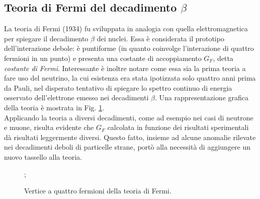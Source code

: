 \documentclass{subnucbo}
\begin{document}
\subsection{Teoria di Fermi del decadimento $\beta$}
La teoria di Fermi (1934) fu sviluppata in analogia con quella elettromagnetica per spiegare il decadimento $\beta$ dei nuclei. Essa è considerata il prototipo dell'interazione debole: è puntiforme (in quanto coinvolge l'interazione di quattro fermioni in un punto) e presenta una costante di accoppiamento $G_{F}$, detta \textit{costante di Fermi}. Interessante è inoltre notare come essa sia la prima teoria a fare uso del neutrino, la cui esistenza era stata ipotizzata solo quattro anni prima da Pauli, nel disperato tentativo di spiegare lo spettro continuo di energia osservato dell'elettrone emesso nei decadimenti $\beta$. Una rappresentazione grafica della teoria è mostrata in Fig. \ref{fig:fermi_decay}.\\
Applicando la teoria a diversi decadimenti, come ad esempio nei casi di neutrone e muone, risulta evidente che $G_{F}$ calcolata in funzione dei risultati sperimentali dà risultati leggermente diversi. Questo fatto, insieme ad alcune anomalie rilevate nei decadimenti deboli di particelle strane, portò alla necessità di aggiungere un nuovo tassello alla teoria.
\begin{figure}[!h]
        \centering
        ;
        \caption{Vertice a quattro fermioni della teoria di Fermi.}
        \label{fig:fermi_decay}
\end{figure}
\end{document}
